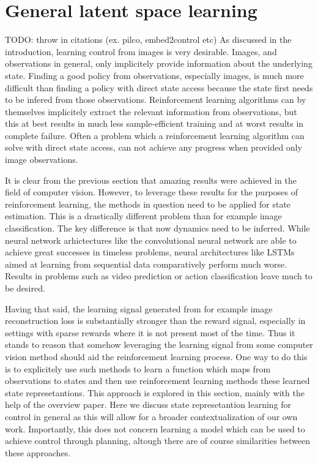 \section{General latent space learning}
TODO: throw in citations (ex. pilco, embed2control etc)
As discussed in the introduction, learning control from images is 
very desirable. Images, and observations in general, only implicitely 
provide information about the underlying state. 
Finding a good policy from observations, especially images,
is much more difficult than finding a policy with direct state access
because the state first needs to be infered from those observations.
Reinforcement learning algorithms can by themselves implicitely extract
the relevant information from observations, but this at best results
in much less sample-efficient training and at worst results
in complete failure.
Often a problem which a reinforcement learning algorithm can solve
with direct state access, can not achieve any progress when
provided only image observations.

It is clear from the previous section that
amazing results were achieved in the field of computer vision.
However, to leverage these results for the purposes of reinforcement
learning, the methods in question need to be applied for state estimation.
This is a drastically different problem than for example image classification.
The key difference is that now dynamics need to be inferred.
While neural network arhictectures like the convolutional neural network
are able to achieve great successes in timeless problems, 
neural architectures like LSTMs aimed at learning from sequential data
comparatively perform much worse.
Results in problems such as video prediction or action classification leave much to be desired.

Having that said, the learning signal generated from for example
image reconstruction loss is substantially stronger than the reward signal,
especially in settings with sparse rewards where it is 
not present most of the time.
Thus it stands to reason that somehow leveraging the learning
signal from some computer vision method should aid the reinforcement learning 
process. 
One way to do this is to explicitely use such methods to learn 
a function which maps from observations to states
and then use reinforcement learning methods these learned state
represetantions.
This approach is explored in this section, mainly with the help
of the 
\cite{staterepresentationlearningoverview}
overview paper.
Here we discuss state represetantion learning for control in general
as this will allow for a broader contextualization of our own work.
Importantly, this does not concern learning a model 
which can be used to achieve control through planning,
altough there are of course similarities between these approaches.

